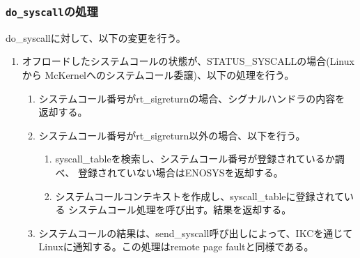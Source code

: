 \documentclass[twoside,11pt,fleqn]{book}
\begin{document}
\subsubsection{\texttt{do\_syscall}の処理}
do\_syscallに対して、以下の変更を行う。
\begin{enumerate}
\item オフロードしたシステムコールの状態が、STATUS\_SYSCALLの場合(Linuxから
McKernelへのシステムコール委譲)、以下の処理を行う。
\begin{enumerate}
\item システムコール番号がrt\_sigreturnの場合、シグナルハンドラの内容を
返却する。
\item システムコール番号がrt\_sigreturn以外の場合、以下を行う。
\begin{enumerate}
\item syscall\_tableを検索し、システムコール番号が登録されているか調べ、
登録されていない場合はENOSYSを返却する。
\item システムコールコンテキストを作成し、syscall\_tableに登録されている
システムコール処理を呼び出す。結果を返却する。
\end{enumerate}
\item システムコールの結果は、send\_syscall呼び出しによって、IKCを通じて
Linuxに通知する。この処理はremote page faultと同様である。
\end{enumerate}
\end{enumerate}
\end{document}
